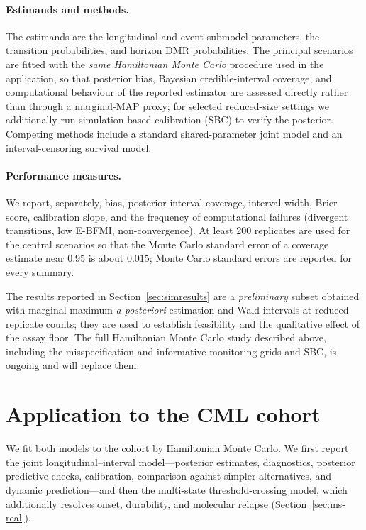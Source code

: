 \documentclass[11pt]{article}
\begin{document}
\paragraph{Estimands and methods.} The estimands are the longitudinal and
event-submodel parameters, the transition probabilities, and horizon DMR
probabilities. The principal scenarios are fitted with the \emph{same
Hamiltonian Monte Carlo} procedure used in the application, so that posterior
bias, Bayesian credible-interval coverage, and computational behaviour of the
reported estimator are assessed directly rather than through a marginal-MAP
proxy; for selected reduced-size settings we additionally run
simulation-based calibration (SBC) to verify the posterior. Competing methods
include a standard shared-parameter joint model and an interval-censoring
survival model.

\paragraph{Performance measures.} We report, separately, bias, posterior
interval coverage, interval width, Brier score, calibration slope, and the
frequency of computational failures (divergent transitions, low E-BFMI,
non-convergence). At least 200 replicates are used for the central scenarios so
that the Monte Carlo standard error of a coverage estimate near $0.95$ is
about $0.015$; Monte Carlo standard errors are reported for every summary.

The results reported in Section~\ref{sec:simresults} are a \emph{preliminary}
subset obtained with marginal maximum-\emph{a-posteriori} estimation and Wald
intervals at reduced replicate counts; they are used to establish feasibility
and the qualitative effect of the assay floor. The full Hamiltonian
Monte Carlo study described above, including the misspecification and
informative-monitoring grids and SBC, is ongoing and will replace them.

\section{Application to the CML cohort}
\label{sec:application}

We fit both models to the cohort by Hamiltonian Monte Carlo. We first report
the joint longitudinal--interval model---posterior estimates, diagnostics,
posterior predictive checks, calibration, comparison against simpler
alternatives, and dynamic prediction---and then the multi-state
threshold-crossing model, which additionally resolves onset, durability, and
molecular relapse (Section~\ref{sec:ms-real}).
\end{document}
